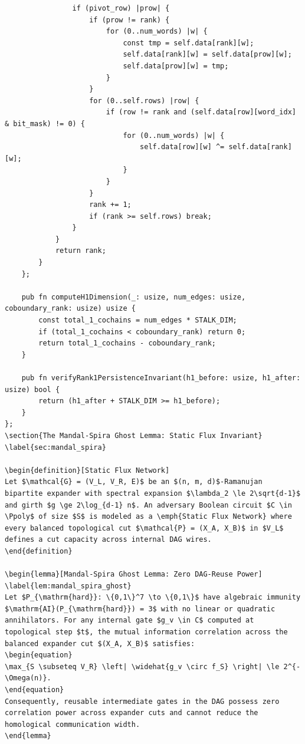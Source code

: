 \documentclass[11pt,a4paper]{article}
\newtheorem{lemma}[theorem]{Lemma}
\theoremstyle{definition}
\newtheorem{definition}[theorem]{Definition}
\theoremstyle{remark}
\newcommand{\Ppoly}{\mathsf{P/poly}}
\begin{document}
\begin{lstlisting}
                if (pivot_row) |prow| {
                    if (prow != rank) {
                        for (0..num_words) |w| {
                            const tmp = self.data[rank][w];
                            self.data[rank][w] = self.data[prow][w];
                            self.data[prow][w] = tmp;
                        }
                    }
                    for (0..self.rows) |row| {
                        if (row != rank and (self.data[row][word_idx] & bit_mask) != 0) {
                            for (0..num_words) |w| {
                                self.data[row][w] ^= self.data[rank][w];
                            }
                        }
                    }
                    rank += 1;
                    if (rank >= self.rows) break;
                }
            }
            return rank;
        }
    };

    pub fn computeH1Dimension(_: usize, num_edges: usize, coboundary_rank: usize) usize {
        const total_1_cochains = num_edges * STALK_DIM;
        if (total_1_cochains < coboundary_rank) return 0;
        return total_1_cochains - coboundary_rank;
    }

    pub fn verifyRank1PersistenceInvariant(h1_before: usize, h1_after: usize) bool {
        return (h1_after + STALK_DIM >= h1_before);
    }
};
\section{The Mandal-Spira Ghost Lemma: Static Flux Invariant}
\label{sec:mandal_spira}

\begin{definition}[Static Flux Network]
Let $\mathcal{G} = (V_L, V_R, E)$ be an $(n, m, d)$-Ramanujan bipartite expander with spectral expansion $\lambda_2 \le 2\sqrt{d-1}$ and girth $g \ge 2\log_{d-1} n$. An adversary Boolean circuit $C \in \Ppoly$ of size $S$ is modeled as a \emph{Static Flux Network} where every balanced topological cut $\mathcal{P} = (X_A, X_B)$ in $V_L$ defines a cut capacity across internal DAG wires.
\end{definition}

\begin{lemma}[Mandal-Spira Ghost Lemma: Zero DAG-Reuse Power]
\label{lem:mandal_spira_ghost}
Let $P_{\mathrm{hard}}: \{0,1\}^7 \to \{0,1\}$ have algebraic immunity $\mathrm{AI}(P_{\mathrm{hard}}) = 3$ with no linear or quadratic annihilators. For any internal gate $g_v \in C$ computed at topological step $t$, the mutual information correlation across the balanced expander cut $(X_A, X_B)$ satisfies:
\begin{equation}
\max_{S \subseteq V_R} \left| \widehat{g_v \circ f_S} \right| \le 2^{-\Omega(n)}.
\end{equation}
Consequently, reusable intermediate gates in the DAG possess zero correlation power across expander cuts and cannot reduce the homological communication width.
\end{lemma}


\end{lstlisting}
\end{document}
